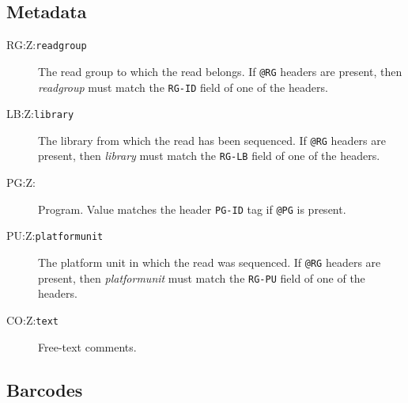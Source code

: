 \documentclass[10pt]{article}
\newcommand{\tagvalue}[1]{\tt #1}
\begin{document}
\subsection{Metadata}

\begin{description}
\item[RG:Z:\tagvalue{readgroup}]
The read group to which the read belongs.
If {\tt @RG} headers are present, then \emph{readgroup} must match the
{\tt RG-ID} field of one of the headers.

\item[LB:Z:\tagvalue{library}]
The library from which the read has been sequenced.
If {\tt @RG} headers are present, then \emph{library} must match the
{\tt RG-LB} field of one of the headers.

\item[PG:Z:\tagvalue{}]
Program. Value matches the header {\tt PG-ID} tag if {\tt @PG} is present.

\item[PU:Z:\tagvalue{platformunit}]
The platform unit in which the read was sequenced.
If {\tt @RG} headers are present, then \emph{platformunit} must match the
{\tt RG-PU} field of one of the headers.

\item[CO:Z:\tagvalue{text}]
Free-text comments.
\end{description}

\subsection{Barcodes}
\end{document}
